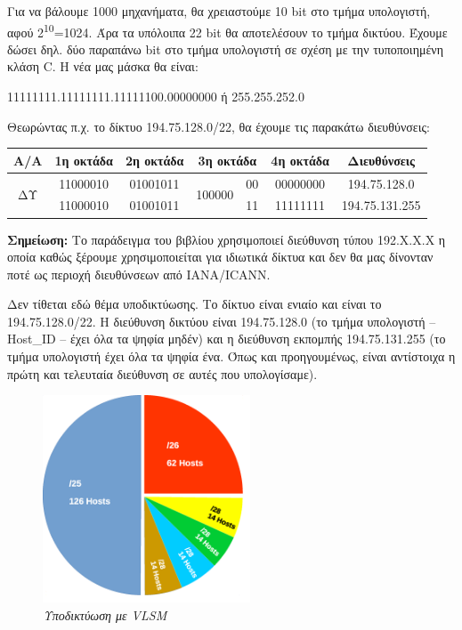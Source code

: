Για να βάλουμε 1000 μηχανήματα, θα χρειαστούμε 10 bit στο τμήμα υπολογιστή, αφού 2\textsuperscript{10}=1024. Άρα τα υπόλοιπα 22 bit θα αποτελέσουν το τμήμα δικτύου. Έχουμε δώσει δηλ. δύο παραπάνω bit στο τμήμα υπολογιστή σε σχέση με την τυποποιημένη κλάση C. Η νέα μας μάσκα θα είναι:

11111111.11111111.11111100.00000000 ή 255.255.252.0

Θεωρώντας π.χ. το δίκτυο 194.75.128.0/22, θα έχουμε τις παρακάτω διευθύνσεις:

\begin{center}
\fontsize{10}{12}
\ttfamily
\begin{tabular}{|c|c|c|c|c|c|c|}
\hline
    Α/Α              & 1η οκτάδα & 2η οκτάδα & \multicolumn{2}{c|}{3η οκτάδα} & 4η οκτάδα & Διευθύνσεις \\ \hline
\multirow{2}{*}{ΔΥ} & 11000010  & 01001011 & \multirow{2}{*}{100000}  & 00 & 00000000 & 194.75.128.0 \\ \cline{2-3} \cline{5-7} 
                  & 11000010 & 01001011 &                    & 11 & 11111111 & 194.75.131.255 \\ \hline
\end{tabular}
\normalfont
\end{center}

\begin{inthebox}
\textbf{Σημείωση:} Το παράδειγμα του βιβλίου χρησιμοποιεί διεύθυνση τύπου 192.Χ.Χ.Χ η οποία καθώς ξέρουμε χρησιμοποιείται για ιδιωτικά δίκτυα και δεν θα μας δίνονταν ποτέ ως περιοχή διευθύνσεων από IANA/ICANN.\\
\end{inthebox}
 
Δεν τίθεται εδώ θέμα υποδικτύωσης. Το δίκτυο είναι ενιαίο και είναι το\\ 194.75.128.0/22. Η διεύθυνση δικτύου είναι 194.75.128.0 (το τμήμα υπολογιστή -- Host\_ID -- έχει όλα τα ψηφία μηδέν) και η διεύθυνση εκπομπής 194.75.131.255 (το τμήμα υπολογιστή έχει όλα τα ψηφία ένα. Όπως και προηγουμένως, είναι αντίστοιχα η πρώτη και τελευταία διεύθυνση σε αυτές που υπολογίσαμε). 

\begin{figure}[!ht]
  \centering
  \includegraphics[width=0.55\textwidth]{images/chapter3/3-4}
  \caption {\textsl{Υποδικτύωση με VLSM}}
  \label{3-4}
\end{figure}



